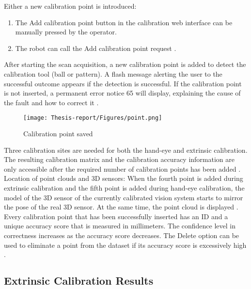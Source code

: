 \documentclass[12pt]{article}
\begin{document}
Either a new calibration point is introduced:
\begin{enumerate}
    \item The Add calibration point button in the calibration web interface can be manually pressed by the operator\cite{ref2}.
    \item The robot can call the Add calibration point request \cite{ref2}.
\end{enumerate}

After starting the scan acquisition, a new calibration point is added to detect the calibration tool (ball or pattern).  A flash message alerting the user to the successful outcome appears if the detection is successful. If the calibration point is not inserted, a permanent error notice 65 will display, explaining the cause of the fault and how to correct it \cite{ref2}.

\begin{figure}[h]
    \centering
    \texttt{[image: Thesis-report/Figures/point.png]}
    \caption{Calibration point saved \cite{ref2}}
    \label{fig:Photoneo Cmaera}
\end{figure} 

Three calibration sites are needed for both the hand-eye and extrinsic calibration. The resulting calibration matrix and the calibration accuracy information are only accessible after the required number of calibration points has been added \cite{ref2}.\\
 
 Location of point clouds and 3D sensors: When the fourth point is added during extrinsic calibration and the fifth point is added during hand-eye calibration, the model of the 3D sensor of the currently calibrated vision system starts to mirror the pose of the real 3D sensor.  At the same time, the point cloud is displayed \cite{ref2}.\\
 Every calibration point that has been successfully inserted has an ID and a unique accuracy score that is measured in millimeters.  The confidence level in correctness increases as the accuracy score decreases.  The Delete option can be used to eliminate a point from the dataset if its accuracy score is excessively high \cite{ref2}.

\subsection{Extrinsic Calibration Results}
\begin{table}[h!]
\centering


\label{tab:transformation_matrix}
\caption{Calibration Results}
\end{table}
\end{document}
